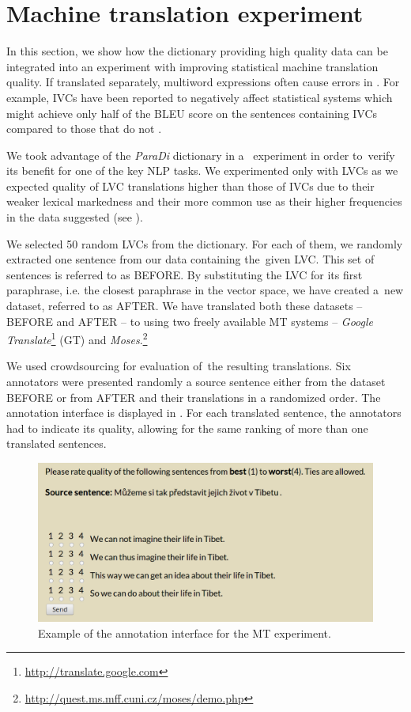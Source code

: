 \documentclass[output=paper
,modfonts
,nonflat]{langsci/langscibook}
\def\footurl#1{\footnote{\url{#1}}}
\begin{document}
\section{Machine translation experiment}
\label{evaluation}
In this section, we show how the dictionary providing high quality data 
can be integrated into an experiment with improving statistical machine 
translation quality. 
If translated separately, multiword expressions often cause errors in 
. For example, IVCs have been reported to negatively affect 
statistical  systems which might achieve only half of the 
BLEU score \citep{Papineni:2002} on the sentences containing IVCs compared to 
those that do not \citep{SaltonRK14}. 

We took advantage of the \emph{ParaDi} dictionary 
in a~ experiment in order to~verify its benefit for one of 
the key NLP tasks. We experimented only with LVCs as we expected quality 
of LVC translations higher than those of IVCs due to their weaker lexical 
markedness and their more common use as their higher frequencies in the data suggested (see ).

We selected 50 random LVCs from the dictionary. For each of them, we 
randomly extracted one sentence from our data containing the~given LVC. This set 
of sentences is referred to as BEFORE. By substituting the LVC for its first 
paraphrase, i.e. the closest paraphrase in the vector space, we have created 
a~new dataset, referred to as AFTER. We have translated both these datasets -- 
BEFORE and AFTER -- to  using two freely available MT systems -- 
\textit{Google Translate}\footurl{http://translate.google.com} (GT) and 
\textit{Moses}.\footurl{http://quest.ms.mff.cuni.cz/moses/demo.php}

We used crowdsourcing for evaluation of~the resulting translations. Six 
annotators were presented randomly a  source sentence either from the 
dataset BEFORE or from AFTER and their  translations in a 
randomized order. The annotation interface is displayed in . 
For each translated sentence, the annotators had to indicate its quality, 
allowing for the same ranking of more than one translated sentences.

\begin{figure}[tb]
\includegraphics[scale=0.33]{figures/anotovatko.png} 
\caption{Example of the annotation interface for the MT experiment.}
\label{interface}
\end{figure}
\end{document}
